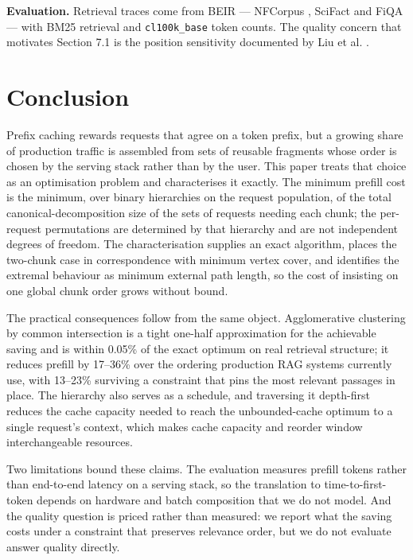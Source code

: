\documentclass[11pt]{article}
\theoremstyle{plain}
\begin{document}
\textbf{Evaluation.} Retrieval traces come from BEIR \cite{THA21} --- NFCorpus \cite{BOT16}, SciFact \cite{WAD20} and FiQA \cite{MAI18} --- with BM25 retrieval and \texttt{cl100k\_base} token counts. The quality concern that motivates Section 7.1 is the position sensitivity documented by Liu et al. \cite{LIU24}.


\section{Conclusion}

Prefix caching rewards requests that agree on a token prefix, but a growing share of production traffic is assembled from sets of reusable fragments whose order is chosen by the serving stack rather than by the user. This paper treats that choice as an optimisation problem and characterises it exactly. The minimum prefill cost is the minimum, over binary hierarchies on the request population, of the total canonical-decomposition size of the sets of requests needing each chunk; the per-request permutations are determined by that hierarchy and are not independent degrees of freedom. The characterisation supplies an exact algorithm, places the two-chunk case in correspondence with minimum vertex cover, and identifies the extremal behaviour as minimum external path length, so the cost of insisting on one global chunk order grows without bound.

The practical consequences follow from the same object. Agglomerative clustering by common intersection is a tight one-half approximation for the achievable saving and is within 0.05\% of the exact optimum on real retrieval structure; it reduces prefill by 17--36\% over the ordering production RAG systems currently use, with 13--23\% surviving a constraint that pins the most relevant passages in place. The hierarchy also serves as a schedule, and traversing it depth-first reduces the cache capacity needed to reach the unbounded-cache optimum to a single request's context, which makes cache capacity and reorder window interchangeable resources.

Two limitations bound these claims. The evaluation measures prefill tokens rather than end-to-end latency on a serving stack, so the translation to time-to-first-token depends on hardware and batch composition that we do not model. And the quality question is priced rather than measured: we report what the saving costs under a constraint that preserves relevance order, but we do not evaluate answer quality directly.
\end{document}
